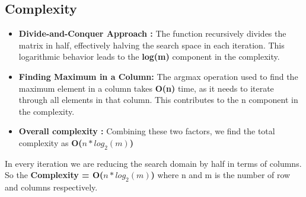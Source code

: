 \documentclass[12pt, a4paper]{article}
\begin{document}
\subsection{Complexity}
    \begin{itemize}
        \item \textbf{Divide-and-Conquer Approach :} The function recursively divides the matrix in half, effectively halving the search space in each iteration. This logarithmic behavior leads to the \textbf{log(m)} component in the complexity.
        \item \textbf{Finding Maximum in a Column:} The argmax operation used to find the maximum element in a column takes \textbf{O(n)} time, as it needs to iterate through all elements in that column. This contributes to the n component in the complexity.
        \item \textbf{Overall complexity :} Combining these two factors, we find the total complexity as \textbf{O($n*log_2(m)$)}
    \end{itemize}
    In every iteration we are reducing the search domain by half in terms of columns. So the 
\textbf{Complexity = O($n*log_2(m)$)} 
 where n and m is the number of row and columns respectively.
\end{document}
